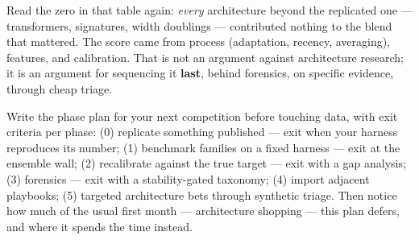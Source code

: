 Read the zero in that table again: \emph{every} architecture beyond the
replicated one --- transformers, signatures, width doublings ---
contributed nothing to the blend that mattered. The score came from
process (adaptation, recency, averaging), features, and calibration.
That is not an argument against architecture research; it is an argument
for sequencing it \textbf{last}, behind forensics, on specific evidence,
through cheap triage.

\begin{drillbox}
Write the phase plan for your next competition before touching data, with
exit criteria per phase: (0) replicate something published --- exit when
your harness reproduces its number; (1) benchmark families on a fixed
harness --- exit at the ensemble wall; (2) recalibrate against the true
target --- exit with a gap analysis; (3) forensics --- exit with a
stability-gated taxonomy; (4) import adjacent playbooks; (5) targeted
architecture bets through synthetic triage. Then notice how much of the
usual first month --- architecture shopping --- this plan defers, and
where it spends the time instead.
\end{drillbox}
